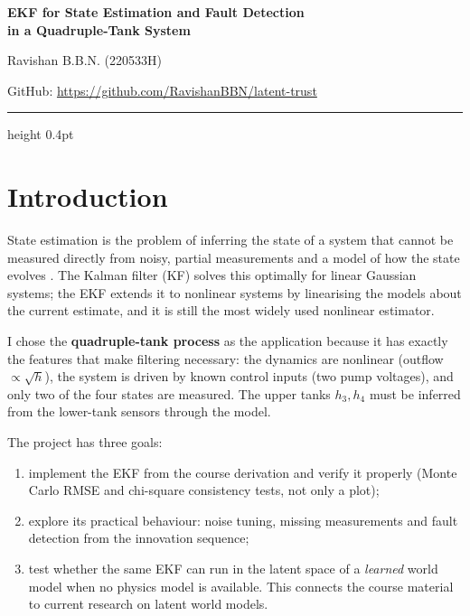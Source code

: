 \documentclass[11pt]{article}
\begin{document}
\raggedbottom
\pagestyle{plain}

\begin{center}
{\fontsize{18}{23}\selectfont\bfseries
EKF for State Estimation and Fault Detection\\[3pt]
in a Quadruple-Tank System\par}
\vspace{9pt}
{\normalsize Ravishan B.B.N. (220533H)\par}
\vspace{6pt}
{\small GitHub: \url{https://github.com/RavishanBBN/latent-trust}\par}
\end{center}
\vspace{2pt}
{\color{gray!45}\hrule height 0.4pt}
\vspace{5pt}

\section{Introduction}
State estimation is the problem of inferring the state of a system that cannot be measured directly from noisy, partial measurements and a model of how the state evolves \cite{thrun2005}. The Kalman filter (KF) solves this optimally for linear Gaussian systems; the EKF extends it to nonlinear systems by linearising the models about the current estimate, and it is still the most widely used nonlinear estimator.

I chose the \textbf{quadruple-tank process} \cite{johansson2000} as the application because it has exactly the features that make filtering necessary: the dynamics are nonlinear (outflow $\propto\sqrt{h}$), the system is driven by known control inputs (two pump voltages), and only two of the four states are measured. The upper tanks $h_3,h_4$ must be inferred from the lower-tank sensors through the model.

The project has three goals:
\begin{enumerate}\itemsep0pt
\item implement the EKF from the course derivation and verify it properly (Monte Carlo RMSE and chi-square consistency tests, not only a plot);
\item explore its practical behaviour: noise tuning, missing measurements and fault detection from the innovation sequence;
\item test whether the same EKF can run in the latent space of a \emph{learned} world model when no physics model is available. This connects the course material to current research on latent world models.
\end{enumerate}
\end{document}
